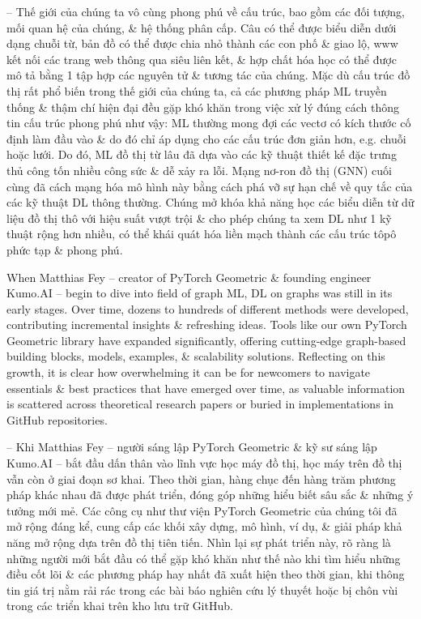 \documentclass{article}
\begin{document}
\begin{itemize}
    -- Thế giới của chúng ta vô cùng phong phú về cấu trúc, bao gồm các đối tượng, mối quan hệ của chúng, \& hệ thống phân cấp. Câu có thể được biểu diễn dưới dạng chuỗi từ, bản đồ có thể được chia nhỏ thành các con phố \& giao lộ, www kết nối các trang web thông qua siêu liên kết, \& hợp chất hóa học có thể được mô tả bằng 1 tập hợp các nguyên tử \& tương tác của chúng. Mặc dù cấu trúc đồ thị rất phổ biến trong thế giới của chúng ta, cả các phương pháp ML truyền thống \& thậm chí hiện đại đều gặp khó khăn trong việc xử lý đúng cách thông tin cấu trúc phong phú như vậy: ML thường mong đợi các vectơ có kích thước cố định làm đầu vào \& do đó chỉ áp dụng cho các cấu trúc đơn giản hơn, e.g. chuỗi hoặc lưới. Do đó, ML đồ thị từ lâu đã dựa vào các kỹ thuật thiết kế đặc trưng thủ công tốn nhiều công sức \& dễ xảy ra lỗi. Mạng nơ-ron đồ thị (GNN) cuối cùng đã cách mạng hóa mô hình này bằng cách phá vỡ sự hạn chế về quy tắc của các kỹ thuật DL thông thường. Chúng mở khóa khả năng học các biểu diễn từ dữ liệu đồ thị thô với hiệu suất vượt trội \& cho phép chúng ta xem DL như 1 kỹ thuật rộng hơn nhiều, có thể khái quát hóa liền mạch thành các cấu trúc tôpô phức tạp \& phong phú.

    When {\sc Matthias Fey} -- creator of PyTorch Geometric \& founding engineer Kumo.AI -- begin to dive into field of graph ML, DL on graphs was still in its early stages. Over time, dozens to hundreds of different methods were developed, contributing incremental insights \& refreshing ideas. Tools like our own PyTorch Geometric library have expanded significantly, offering cutting-edge graph-based building blocks, models, examples, \& scalability solutions. Reflecting on this growth, it is clear how overwhelming it can be for newcomers to navigate essentials \& best practices that have emerged over time, as valuable information is scattered across theoretical research papers or buried in implementations in GitHub repositories.

    -- Khi {\sc Matthias Fey} -- người sáng lập PyTorch Geometric \& kỹ sư sáng lập Kumo.AI -- bắt đầu dấn thân vào lĩnh vực học máy đồ thị, học máy trên đồ thị vẫn còn ở giai đoạn sơ khai. Theo thời gian, hàng chục đến hàng trăm phương pháp khác nhau đã được phát triển, đóng góp những hiểu biết sâu sắc \& những ý tưởng mới mẻ. Các công cụ như thư viện PyTorch Geometric của chúng tôi đã mở rộng đáng kể, cung cấp các khối xây dựng, mô hình, ví dụ, \& giải pháp khả năng mở rộng dựa trên đồ thị tiên tiến. Nhìn lại sự phát triển này, rõ ràng là những người mới bắt đầu có thể gặp khó khăn như thế nào khi tìm hiểu những điều cốt lõi \& các phương pháp hay nhất đã xuất hiện theo thời gian, khi thông tin giá trị nằm rải rác trong các bài báo nghiên cứu lý thuyết hoặc bị chôn vùi trong các triển khai trên kho lưu trữ GitHub.


\end{itemize}
\end{document}

